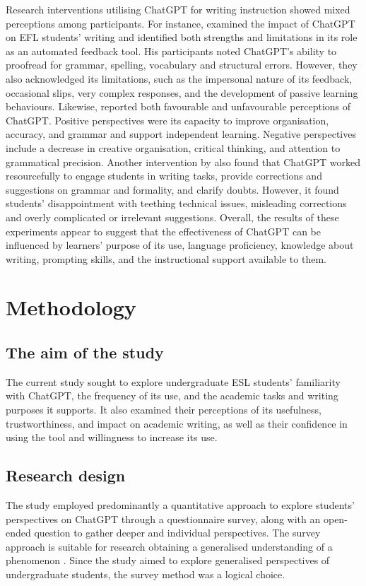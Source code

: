 \documentclass[english]{textolivre}
\begin{document}
Research interventions utilising ChatGPT for writing instruction showed mixed perceptions among participants. For instance, \textcite{teng2024b} examined the impact of ChatGPT on EFL students’ writing and identified both strengths and limitations in its role as an automated feedback tool. His participants noted ChatGPT’s ability to proofread for grammar, spelling, vocabulary and structural errors. However, they also acknowledged its limitations, such as the impersonal nature of its feedback, occasional slips, very complex responses, and the development of passive learning behaviours. Likewise, \textcite{mahapatra2024} reported both favourable and unfavourable perceptions of ChatGPT. Positive perspectives were its capacity to improve organisation, accuracy, and grammar and support independent learning. Negative perspectives include a decrease in creative organisation, critical thinking, and attention to grammatical precision. Another intervention by \textcite{punar2024} also found that ChatGPT worked resourcefully to engage students in writing tasks, provide corrections and suggestions on grammar and formality, and clarify doubts. However, it found students’ disappointment with teething technical issues, misleading corrections and overly complicated or irrelevant suggestions. Overall, the results of these experiments appear to suggest that the effectiveness of ChatGPT can be influenced by learners’ purpose of its use, language proficiency, knowledge about writing, prompting skills, and the instructional support available to them.

\section{Methodology}
\subsection{The aim of the study}
The current study sought to explore undergraduate ESL students’ familiarity with ChatGPT, the frequency of its use, and the academic tasks and writing purposes it supports. It also examined their perceptions of its usefulness, trustworthiness, and impact on academic writing, as well as their confidence in using the tool and willingness to increase its use.

\subsection{Research design}
The study employed predominantly a quantitative approach to explore students’ perspectives on ChatGPT through a questionnaire survey, along with an open-ended question to gather deeper and individual perspectives. The survey approach is suitable for research obtaining a generalised understanding of a phenomenon \cite{creswell2017}. Since the study aimed to explore generalised perspectives of undergraduate students, the survey method was a logical choice.
\end{document}
